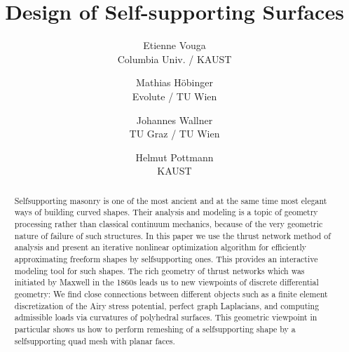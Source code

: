 \documentclass[review]{acmsiggraph}
\title{Design of Self-supporting Surfaces}
\author{
	Etienne Vouga
	\\ Columbia Univ. / KAUST
\and
	Mathias H\"obinger
	\\ Evolute / TU Wien
\and
	Johannes Wallner
	\\ TU Graz / TU Wien
\and 
	Helmut Pottmann
	\\ KAUST
}
\begin{document}



\maketitle


\begin{abstract} Self\dash supporting masonry is one of the most ancient 
and at the same time most elegant ways of building curved shapes. Their 
analysis and modeling is a topic of geometry processing rather than 
classical continuum mechanics, because of the very geometric nature of 
failure of such structures. In this paper we use the thrust network method 
of analysis and present an iterative nonlinear optimization algorithm for 
efficiently approximating freeform shapes by self\dash supporting ones. 
This provides an interactive modeling tool for such shapes. The rich 
geometry of thrust networks which was initiated by Maxwell in the 
1860s leads us to new viewpoints of discrete differential geometry: We 
find close connections between different objects such as a finite\dash 
element discretization of the Airy stress potential, perfect graph 
Laplacians, and computing admissible loads via curvatures of polyhedral 
surfaces. This geometric viewpoint in particular shows us how to perform 
remeshing of a self\dash supporting shape by a self\dash supporting
quad mesh with planar faces.

\end{abstract}
\end{document}

